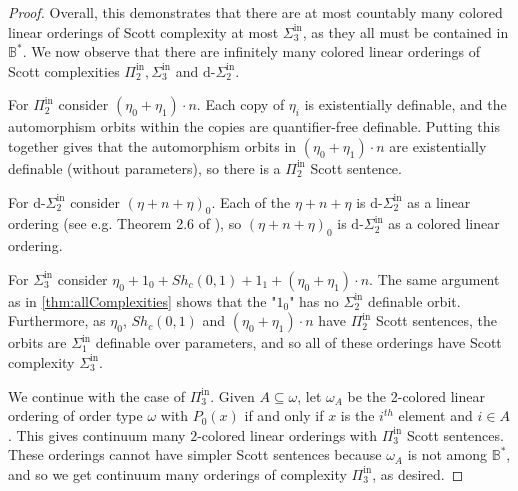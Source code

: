 \documentclass[11pt]{amsart}
\newcommand{\Pinf}[1]{\Pi^{\mathrm{in}}_{#1}}
\newcommand{\Sinf}[1]{\Sigma^{\mathrm{in}}_{#1}}
\theoremstyle{remark}
\begin{document}
\begin{proof}
    Overall, this demonstrates that there are at most countably many colored linear orderings of Scott complexity at most $\Sinf{3}$, as they all must be contained in $\mathbb{B}^*$.
    We now observe that there are infinitely many colored linear orderings of Scott complexities  $\Pinf{2}, \Sinf{3}$ and $\text{d-}\Sinf{2}$.
    
    For $\Pinf{2}$ consider $(\eta_0+\eta_1)\cdot n$.
    Each copy of $\eta_i$ is existentially definable, and the automorphism orbits within the copies are quantifier-free definable.
    Putting this together gives that the automorphism orbits in $(\eta_0+\eta_1)\cdot n$ are existentially definable (without parameters), so there is a $\Pinf{2}$ Scott sentence.
    
    For $\text{d-}\Sinf{2}$ consider $(\eta+n+\eta)_0$.
    Each of the $\eta+n+\eta$ is $\text{d-}\Sinf{2}$ as a linear ordering (see e.g. Theorem 2.6 of \cite{GR23}), so $(\eta+n+\eta)_0$ is $\text{d-}\Sinf{2}$ as a colored linear ordering.
    
    For $\Sinf{3}$ consider $\eta_0+1_0+Sh_c(0,1)+1_1+(\eta_0+\eta_1)\cdot n$.
    The same argument as in \cref{thm:allComplexities} shows that the "$1_0$" has no $\Sinf{2}$ definable orbit.
    Furthermore, as $\eta_0$, $Sh_c(0,1)$ and $(\eta_0+\eta_1)\cdot n$ have $\Pinf{2}$ Scott sentences, the orbits are $\Sinf{1}$ definable over parameters, and so all of these orderings have Scott complexity $\Sinf{3}$.
   
    We continue with the case of $\Pinf{3}$.
    Given $A\subseteq \omega$, let $\omega_A$ be the 2-colored linear ordering of order type $\omega$ with $P_0(x)$ if and only if $x$ is the $i^{th}$ element and $i\in A$.
    This gives continuum many $2$-colored linear orderings with $\Pinf{3}$ Scott sentences.
    These orderings cannot have simpler Scott sentences because $\omega_A$ is not among $\mathbb{B}^*$, and so we get continuum many orderings of complexity $\Pinf{3}$, as desired.


\end{proof}
\end{document}
